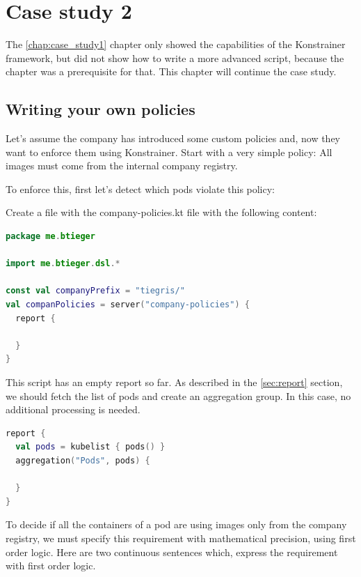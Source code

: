 \chapter{Case study 2}
\label{chap:case_study2}

The \ref{chap:case_study1} chapter only showed the capabilities of the Konstrainer framework, but did not show how to write a more advanced script, because the  chapter was a prerequisite for that. This chapter will continue the case study.

\section{Writing your own policies}

Let's assume the company has introduced some custom policies and, now they want to enforce them using Konstrainer. Start with a very simple policy: All images must come from the internal company registry.

To enforce this, first let's detect which pods violate this policy:

Create a file with the company-policies.kt file with the following content:

\begin{lstlisting}[caption={Report skeleton},language=Kotlin,label=code:todo]
package me.btieger

import me.btieger.dsl.*

const val companyPrefix = "tiegris/"
val companPolicies = server("company-policies") {
  report {

  }
}
\end{lstlisting}

This script has an empty report so far. As described in the \ref{sec:report} section, we should fetch the list of pods and create an aggregation group. In this case, no additional processing is needed.

\begin{lstlisting}[caption={Aggregation group},language=Kotlin,label=code:todo]
report {
  val pods = kubelist { pods() }
  aggregation("Pods", pods) {

  }
}
\end{lstlisting}

To decide if all the containers of a pod are using images only from the company registry, we must specify this requirement with mathematical precision, using first order logic. Here are two continuous sentences which, express the requirement with first order logic.

